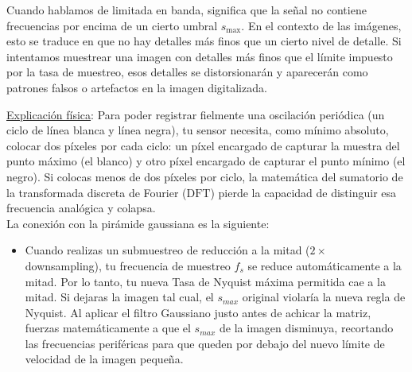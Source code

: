 \begin{observacion}
    Cuando hablamos de limitada en banda, significa que la señal no contiene frecuencias por encima de un cierto umbral $s_{\text{max}}$. En el contexto de las imágenes, esto se traduce en que no hay detalles más finos que un cierto nivel de detalle. Si intentamos muestrear una imagen con detalles más finos que el límite impuesto por la tasa de muestreo, esos detalles se distorsionarán y aparecerán como patrones falsos o artefactos en la imagen digitalizada. \\
\end{observacion}

\noindent
\underline{Explicación física}: Para poder registrar fielmente una oscilación periódica (un ciclo de línea blanca y línea negra), tu sensor necesita, como mínimo absoluto, colocar dos píxeles por cada ciclo: un píxel encargado de capturar la muestra del punto máximo (el blanco) y otro píxel encargado de capturar el punto mínimo (el negro). Si colocas menos de dos píxeles por ciclo, la matemática del sumatorio de la transformada discreta de Fourier ($\text{DFT}$) pierde la capacidad de distinguir esa frecuencia analógica y colapsa. \\

\noindent
La conexión con la pirámide gaussiana es la siguiente:
\begin{itemize}
    \item Cuando realizas un submuestreo de reducción a la mitad ($2\times$ downsampling), tu frecuencia de muestreo $f_s$ se reduce automáticamente a la mitad. Por lo tanto, tu nueva Tasa de Nyquist máxima permitida cae a la mitad. Si dejaras la imagen tal cual, el $s_{max}$ original violaría la nueva regla de Nyquist. Al aplicar el filtro Gaussiano justo antes de achicar la matriz, fuerzas matemáticamente a que el $s_{max}$ de la imagen disminuya, recortando las frecuencias periféricas para que queden por debajo del nuevo límite de velocidad de la imagen pequeña.
\end{itemize}
